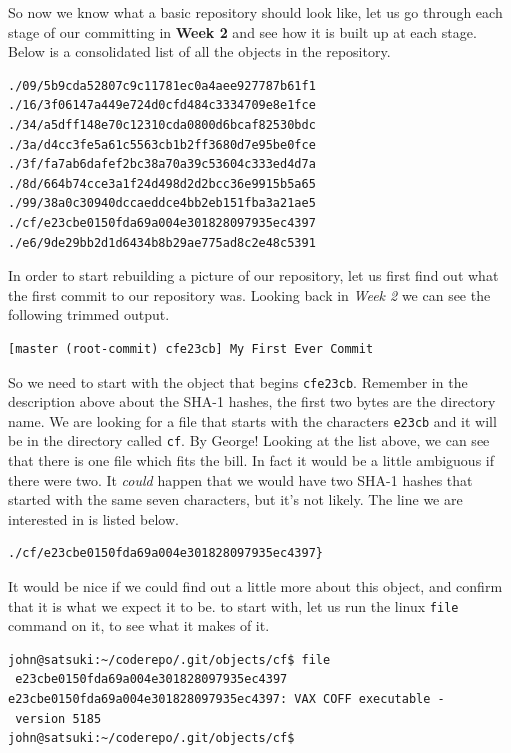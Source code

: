 So now we know what a basic repository should look like, let us go through each stage of our committing in \textbf{Week 2} and see how it is built up at each stage.  Below is a consolidated list of all the objects in the repository.  

\begin{Verbatim}
./09/5b9cda52807c9c11781ec0a4aee927787b61f1
./16/3f06147a449e724d0cfd484c3334709e8e1fce
./34/a5dff148e70c12310cda0800d6bcaf82530bdc
./3a/d4cc3fe5a61c5563cb1b2ff3680d7e95be0fce
./3f/fa7ab6dafef2bc38a70a39c53604c333ed4d7a
./8d/664b74cce3a1f24d498d2d2bcc36e9915b5a65
./99/38a0c30940dccaeddce4bb2eb151fba3a21ae5
./cf/e23cbe0150fda69a004e301828097935ec4397
./e6/9de29bb2d1d6434b8b29ae775ad8c2e48c5391
\end{Verbatim}

In order to start rebuilding a picture of our repository, let us first find out what the first commit to our repository was.  Looking back in \emph{Week 2} we can see the following trimmed output.

\begin{Verbatim}
[master (root-commit) cfe23cb] My First Ever Commit
\end{Verbatim}

So we need to start with the object that begins \texttt{cfe23cb}.  Remember in the description above about the SHA-1 hashes, the first two bytes are the directory name.  We are looking for a file that starts with the characters \texttt{e23cb} and it will be in the directory called \texttt{cf}.  By George!  Looking at the list above, we can see that there is one file which fits the bill.  In fact it would be a little ambiguous if there were two.  It \emph{could} happen that we would have two SHA-1 hashes  that started with the same seven characters, but it's not likely.  The line we are interested in is listed below.

\begin{Verbatim}
./cf/e23cbe0150fda69a004e301828097935ec4397}
\end{Verbatim}

It would be nice if we could find out a little more about this object, and confirm that it is what we expect it to be.  to start with, let us run the linux \texttt{file} command on it, to see what it makes of it.

\begin{Verbatim}
john@satsuki:~/coderepo/.git/objects/cf$ file 
 e23cbe0150fda69a004e301828097935ec4397 
e23cbe0150fda69a004e301828097935ec4397: VAX COFF executable - 
 version 5185
john@satsuki:~/coderepo/.git/objects/cf$ 
\end{Verbatim}

